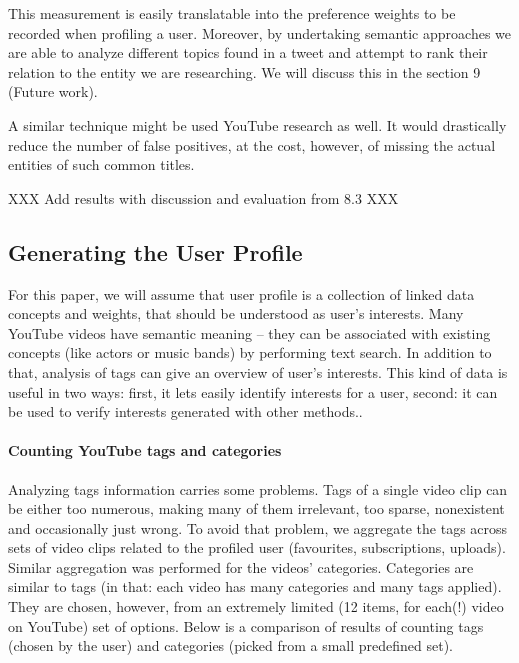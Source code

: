 This measurement is easily translatable into the preference weights to be recorded when profiling a user.
Moreover, by undertaking semantic approaches we are able to analyze different topics found in a tweet and
attempt to rank their relation to the entity we are researching. We will discuss this in the section 9 (Future work).

A similar technique might be used YouTube research as well. It would
drastically reduce the number of false positives, at the cost, however, of
missing the actual entities of such common titles.

XXX Add results with discussion and evaluation from 8.3 XXX

\subsection{Generating the User Profile}

For this paper, we will assume that user profile is a collection of linked data concepts and weights, that should be understood as user's interests. Many YouTube videos have semantic meaning -- they can
be associated with existing concepts (like actors or music bands) by performing
text search. In addition to that, analysis of tags can give an overview of user's
interests. This kind of data is useful in two
ways: first, it lets easily identify interests for a user, second: it can be
used to verify interests generated with other methods..

\paragraph{Counting YouTube tags and categories}
Analyzing tags information carries some problems. Tags of a single video clip
can be either too numerous, making many
of them irrelevant, too sparse, nonexistent and occasionally just wrong. To avoid
that problem, we aggregate the tags across sets of video clips related to the
profiled user (favourites, subscriptions, uploads). Similar aggregation was
performed for the videos' categories. Categories are similar to tags (in that:
each video has many categories and many tags applied). They are chosen,
however, from an extremely limited (12 items, for each(!) video on YouTube) set
of options.  Below is a comparison of results of counting
tags (chosen by the user) and categories (picked from a small predefined set).


